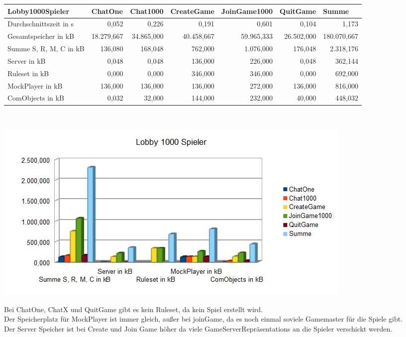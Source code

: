 \documentclass[a4paper]{article}
\begin{document}
\noindent
\begin{tabular}{|l|r|r|r|r|r|r|}
\hline
Lobby1000Spieler & \multicolumn{1}{l|}{ChatOne} & \multicolumn{1}{l|}{Chat1000} & \multicolumn{1}{l|}{CreateGame} & \multicolumn{1}{l|}{JoinGame1000} & \multicolumn{1}{l|}{QuitGame} & \multicolumn{1}{l|}{Summe} \\ \hline
Durchschnittszeit in s & 0,052 & 0,226 & 0,191 & 0,601 & 0,104 & 1,173 \\ \hline
Gesamtspeicher in kB & 18.279,667 & 34.865,000 & 40.458,667 & 59.965,333 & 26.502,000 & 180.070,667 \\ \hline
Summe S, R, M, C in kB & 136,080 & 168,048 & 762,000 & 1.076,000 & 176,048 & 2.318,176 \\ \hline
Server in kB & 0,048 & 0,048 & 136,000 & 226,000 & 0,048 & 362,144 \\ \hline
Ruleset in kB & 0,000 & 0,000 & 346,000 & 346,000 & 0,000 & 692,000 \\ \hline
MockPlayer in kB & 136,000 & 136,000 & 136,000 & 272,000 & 136,000 & 816,000 \\ \hline
ComObjects in kB & 0,032 & 32,000 & 144,000 & 232,000 & 40,000 & 448,032 \\ \hline
\end{tabular}
\ \\
\begin{center}
\includegraphics[scale=0.75]{2}
\end{center}
Bei ChatOne, ChatX und QuitGame gibt es kein Ruleset, da kein Spiel erstellt wird. \\
Der Speicherplatz für MockPlayer ist immer gleich, außer bei joinGame, da es noch einmal soviele Gamemaster für die Spiele gibt. \\
Der Server Speicher ist bei Create und Join Game höher da viele GameServerRepräsentations an die Spieler verschickt werden. \\
\ \\
\ \\
\end{document}
